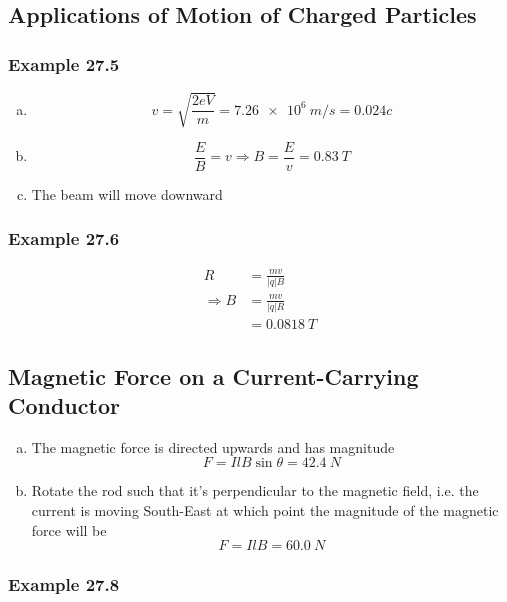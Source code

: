 \documentclass{article}
\begin{document}
\subsection{Applications of Motion of Charged Particles}

\subsubsection{Example 27.5}

\begin{enumerate}[(a)]
  \item \[v = \sqrt{\frac{2 e V}{m}} = \qty{7.26e6}{m/s} = 0.024c\]

  \item \[\frac{E}{B} = v \Rightarrow B = \frac{E}{v} = \qty{0.83}{T}\]

  \item The beam will move downward
\end{enumerate}

\subsubsection{Example 27.6}

\begin{align*}
  R             & = \frac{m v}{|q| B} \\
  \Rightarrow B & = \frac{m v}{|q| R} \\
                & = \qty{0.0818}{T}
\end{align*}

\subsection{Magnetic Force on a Current-Carrying Conductor}

\begin{enumerate}[(a)]
  \item The magnetic force is directed upwards and has magnitude \[F = I l B \sin \theta = \qty{42.4}{N}\]

  \item Rotate the rod such that it's perpendicular to the magnetic field, i.e. the current is moving South-East at which point the magnitude of the magnetic force will be \[F = I l B = \qty{60.0}{N}\]
\end{enumerate}

\subsubsection{Example 27.8}
\end{document}

